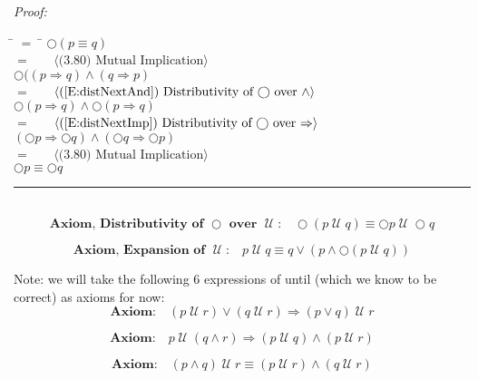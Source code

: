 \documentclass[fleqn, leqno]{article}
\newcommand{\lgap}{2pt}                             %
\newcommand{\mymathindent}{24pt}                      %
\newcommand{\myqed}{\hfill\rule[-.23ex]{1.2ex}{2.0ex}}
\newcommand{\until}{\;\mathcal{U}\;}
\newcommand{\Gll} {\langle}                         %
\newcommand{\Ggg} {\rangle}                         %
\newcommand{\Hint}[1]     {\ \ \ $\Gll              \mbox{#1} \Ggg$ }   %
\begin{document}
\emph{Proof:}
\begin{tabbing}
\hspace{\mymathindent} \= $= \;$ \= \kill
  \> \>   $\bigcirc (p \equiv q)$\\[\lgap]
  \> $=$  \>  \Hint{(3.80) Mutual Implication}\\[\lgap]
  \> \>   $\bigcirc ((p \Rightarrow q) \land (q \Rightarrow p)$\\[\lgap]
  \> $=$  \>  \Hint{(\ref{E:distNextAnd}) Distributivity of $\bigcirc$ over $\land$}\\[\lgap]
  \> \>   $\bigcirc (p \Rightarrow q) \land \bigcirc (p \Rightarrow q)$\\[\lgap]
  \> $=$  \>  \Hint{(\ref{E:distNextImp}) Distributivity of $\bigcirc$ over $\Rightarrow$}\\[\lgap]
  \> \>   $(\bigcirc p \Rightarrow \bigcirc q) \land (\bigcirc q \Rightarrow \bigcirc p)$\\[\lgap]
  \> $=$  \>  \Hint{(3.80) Mutual Implication}\\[\lgap]
  \> \>   $\bigcirc p \equiv \bigcirc q$
\end{tabbing}
\myqed\\[\lgap]


\begin{equation}\label{E:distNextUntil}
\textbf{Axiom, Distributivity of $\bigcirc$ over $\until$:}\quad \bigcirc (p \until q) \equiv \bigcirc p \until \bigcirc q
\end{equation}

\begin{equation}\label{E:expansionUntil}
\textbf{Axiom, Expansion of $\until$:}\quad p \until q \equiv q \lor (p \land \bigcirc (p \until q))
\end{equation}

Note: we will take the following 6 expressions of until (which we know to be correct) as axioms for now:\\

\begin{equation}\label{E:untilOrImp}
\textbf{Axiom:}\quad (p \until r) \lor (q \until r) \Rightarrow (p \lor q) \until r
\end{equation}

\begin{equation}\label{E:untilAndImp}
\textbf{Axiom:}\quad p \until (q \land r) \Rightarrow (p \until q) \land (p \until r)
\end{equation}

\begin{equation}\label{E:untilAndEquiv}
\textbf{Axiom:}\quad (p \land q) \until r \equiv (p \until r) \land (q \until r)
\end{equation}
\end{document}
